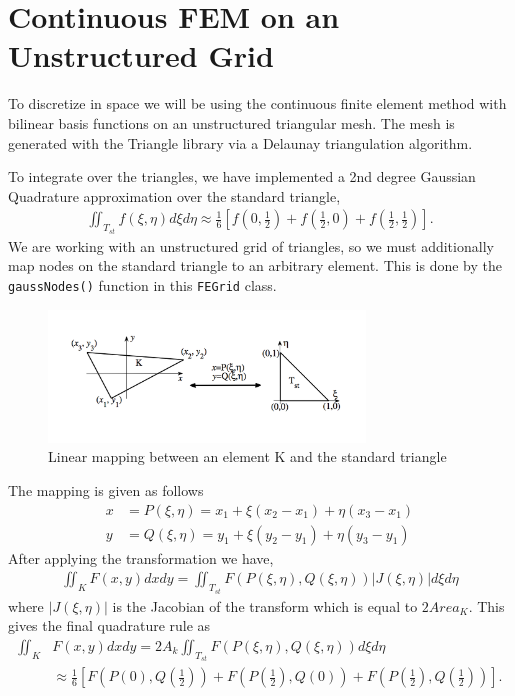 \section{Continuous FEM on an Unstructured Grid}
To discretize in space we will be using the continuous finite element method with bilinear basis functions on an unstructured triangular mesh. The mesh is generated with the Triangle library \cite{shewchuk96b} via a Delaunay triangulation algorithm. 
\par
To integrate over the triangles, we have implemented a 2nd degree Gaussian Quadrature approximation over the standard triangle,
\begin{align}
    \iint_{T_{st}} f(\xi, \eta) d\xi d\eta \approx \frac{1}{6}\left [ f\left( 0, \frac{1}{2} \right ) + f \left( \frac{1}{2}, 0 \right) + f \left( \frac{1}{2}, \frac{1}{2} \right)\right].
\end{align}
We are working with an unstructured grid of triangles, so we must additionally map nodes on the standard triangle to an arbitrary element. This is done by the \texttt{gaussNodes()} function in this \texttt{FEGrid} class. 
\begin{figure}[h]
    \centering
    \includegraphics[width=0.75\textwidth]{fig/TriangleMapping}
    \caption{Linear mapping between an element K and the standard triangle}
    \label{fig:my_label}
\end{figure}
The mapping is given as follows
\begin{align}
    x &= P(\xi, \eta) = x_1 + \xi(x_2 - x_1) + \eta(x_3 - x_1) \\
    y &= Q(\xi, \eta) = y_1 + \xi(y_2 - y_1) + \eta(y_3 - y_1)
\end{align}
After applying the transformation we have,
\begin{align}
 \iint_{K} F(x, y) dx dy = \iint_{T_{st}}F(P(\xi, \eta), Q(\xi, \eta))|J(\xi, \eta)|d\xi d\eta
\end{align}
where $|J(\xi, \eta)|$ is the Jacobian of the transform which is equal to $2Area_K$. This gives the final quadrature rule as
\begin{align}
 \iint_{K} &F(x, y) dx dy = 2A_k\iint_{T_{st}}F(P(\xi, \eta), Q(\xi, \eta))d\xi d\eta \\
 &\approx \frac{1}{6}\left [ F\left( P(0), Q(\frac{1}{2}) \right) + F \left( P(\frac{1}{2}), Q(0) \right) + F \left( P(\frac{1}{2}), Q(\frac{1}{2}) \right)\right].
\end{align}

